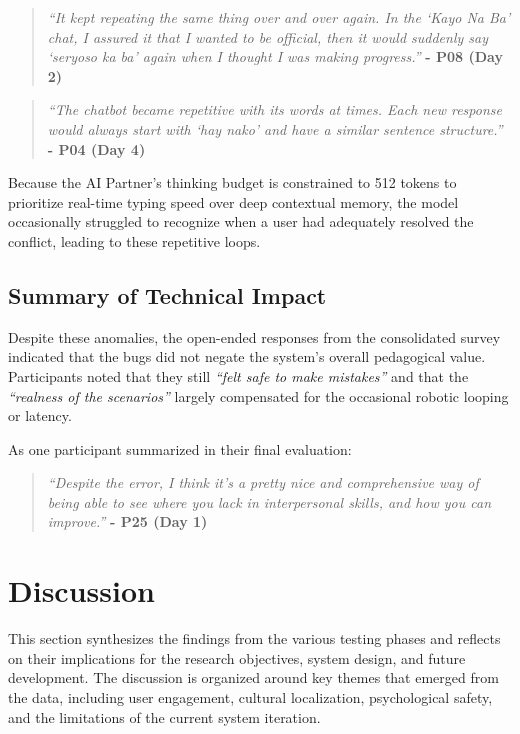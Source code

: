 \begin{quote}
\textit{``It kept repeating the same thing over and over again. In the `Kayo Na Ba' chat, I assured it that I wanted to be official, then it would suddenly say `seryoso ka ba' again when I thought I was making progress.''} \textbf{- P08 (Day 2)}
\end{quote}

\begin{quote}
\textit{``The chatbot became repetitive with its words at times. Each new response would always start with `hay nako' and have a similar sentence structure.''} \textbf{- P04 (Day 4)}
\end{quote}

Because the AI Partner's thinking budget is constrained to 512 tokens to prioritize real-time typing speed over deep contextual memory, the model occasionally struggled to recognize when a user had adequately resolved the conflict, leading to these repetitive loops.

\subsection{Summary of Technical Impact}
Despite these anomalies, the open-ended responses from the consolidated survey indicated that the bugs did not negate the system's overall pedagogical value. Participants noted that they still \textit{``felt safe to make mistakes''} and that the \textit{``realness of the scenarios''} largely compensated for the occasional robotic looping or latency. 

As one participant summarized in their final evaluation:
\begin{quote}
\textit{``Despite the error, I think it's a pretty nice and comprehensive way of being able to see where you lack in interpersonal skills, and how you can improve.''} \textbf{- P25 (Day 1)}
\end{quote}

\section{Discussion}
\indent This section synthesizes the findings from the various testing 
phases and reflects on their implications for the research objectives, 
system design, and future development. The discussion is organized around 
key themes that emerged from the data, including user engagement, cultural 
localization, psychological safety, and the limitations of the current 
system iteration.

